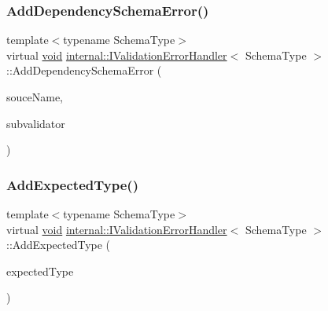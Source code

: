 \mbox{\label{classinternal_1_1IValidationErrorHandler_a4b43ba6e6a9c544dfc631297104dc508}} 
\subsubsection{\texorpdfstring{Add\+Dependency\+Schema\+Error()}{AddDependencySchemaError()}}
{\footnotesize\ttfamily template$<$typename Schema\+Type$>$ \\
virtual \hyperlink{imgui__impl__opengl3__loader_8h_ac668e7cffd9e2e9cfee428b9b2f34fa7}{void} \hyperlink{classinternal_1_1IValidationErrorHandler}{internal\+::\+I\+Validation\+Error\+Handler}$<$ Schema\+Type $>$\+::Add\+Dependency\+Schema\+Error (\begin{DoxyParamCaption}\item[{const \hyperlink{classinternal_1_1IValidationErrorHandler_a22eda6c4ea9537f1ba00d76af052649a}{S\+Value} \&}]{souce\+Name,  }\item[{\hyperlink{classinternal_1_1ISchemaValidator}{I\+Schema\+Validator} $\ast$}]{subvalidator }\end{DoxyParamCaption})\hspace{0.3cm}{\ttfamily [pure virtual]}}

\mbox{\label{classinternal_1_1IValidationErrorHandler_a5e4d9e5d937bd54e481f90e23ec3aea4}} 
\subsubsection{\texorpdfstring{Add\+Expected\+Type()}{AddExpectedType()}}
{\footnotesize\ttfamily template$<$typename Schema\+Type$>$ \\
virtual \hyperlink{imgui__impl__opengl3__loader_8h_ac668e7cffd9e2e9cfee428b9b2f34fa7}{void} \hyperlink{classinternal_1_1IValidationErrorHandler}{internal\+::\+I\+Validation\+Error\+Handler}$<$ Schema\+Type $>$\+::Add\+Expected\+Type (\begin{DoxyParamCaption}\item[{const typename Schema\+Type\+::\+Value\+Type \&}]{expected\+Type }\end{DoxyParamCaption})\hspace{0.3cm}{\ttfamily [pure virtual]}}

